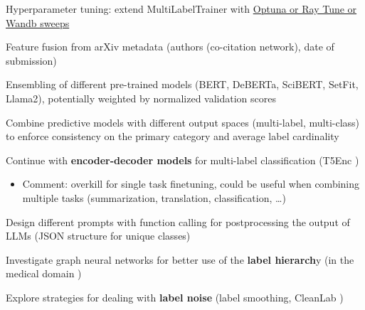 \documentclass[11pt,letterpaper]{article}
\begin{document}
\begin{todolist}
\item Hyperparameter tuning: extend MultiLabelTrainer with \href{https://huggingface.co/docs/transformers/en/hpo_train}{Optuna or Ray Tune or Wandb sweeps}
\item Feature fusion from arXiv metadata (\eg authors (co-citation network), date of submission)
\item Ensembling of different pre-trained models (\eg BERT, DeBERTa, SciBERT, SetFit, Llama2), potentially weighted by normalized validation scores
\item Combine predictive models with different output spaces (\eg multi-label, multi-class) to enforce consistency on the primary category and average label cardinality
\item Continue with \textbf{encoder-decoder models} for multi-label classification (\eg T5Enc \cite{kementchedjhieva2023exploration})
\begin{itemize}
  \item Comment: overkill for single task finetuning, could be useful when combining multiple tasks (summarization, translation, classification, \ldots)
\end{itemize}
\item Design different prompts with function calling for postprocessing the output of LLMs (\eg JSON structure for unique classes)
\item Investigate graph neural networks for better use of the \textbf{label hierarch}y (\eg in the medical domain \cite{chi2024graph})
\item Explore strategies for dealing with \textbf{label noise} (\eg label smoothing, CleanLab \cite{kumar2020robust,oyen2022robustness})
\end{todolist}

{\small


}
\end{document}

